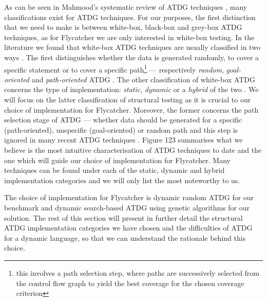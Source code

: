 \documentclass[a4paper,11pt,titlepage]{report}
\begin{document}
As can be seen in Mahmood's systematic review of ATDG techniques \cite{mahmood2007systematic}, many classifications exist for ATDG techniques. For our purposes, the first distinction that we need to make is between white-box, black-box and grey-box ATDG techniques, as for Flycatcher we are only interested in white-box testing. In the literature we found that white-box ATDG techniques are usually classified in two ways \cite{mahmood2007systematic, edvardsson1999survey, tahbildar2automated}. The first distinguishes whether the data is generated randomly, to cover a specific statement or to cover a specific path\footnote{this involves a path selection step, where paths are successively selected from the control flow graph to yield the best coverage for the chosen coverage criterion} --- respectively \emph{random}, \emph{goal-oriented} and \emph{path-oriented} ATDG \cite{edvardsson1999survey}. The other classification of white-box ATDG concerns the type of implementation: \emph{static}, \emph{dynamic} or a \emph{hybrid} of the two \cite{han2008empirical, mcminn2004search}. We will focus on the latter classification of structural testing as it is crucial to our choice of implementation for Flycatcher. Moreover, the former concerns the path selection stage of ATDG --- whether data should be generated for a specific (path-oriented), unspecific (goal-oriented) or random path and this step is ignored in many recent ATDG techniques \cite{tahbildar2automated}. Figure 123 summarises what we believe is the most intuitive characterisation of ATDG techniques to date and the one which will guide our choice of implementation for Flycatcher. Many techniques can be found under each of the static, dynamic and hybrid implementation categories and we will only list the most noteworthy to us.

The choice of implementation for Flycatcher is dynamic random ATDG for our benchmark and dynamic search-based ATDG using genetic algorithms for our solution. The rest of this section will present in further detail the structural ATDG implementation categories we have chosen and the difficulties of ATDG for a dynamic language, so that we can understand the rationale behind this choice.

\end{document}
